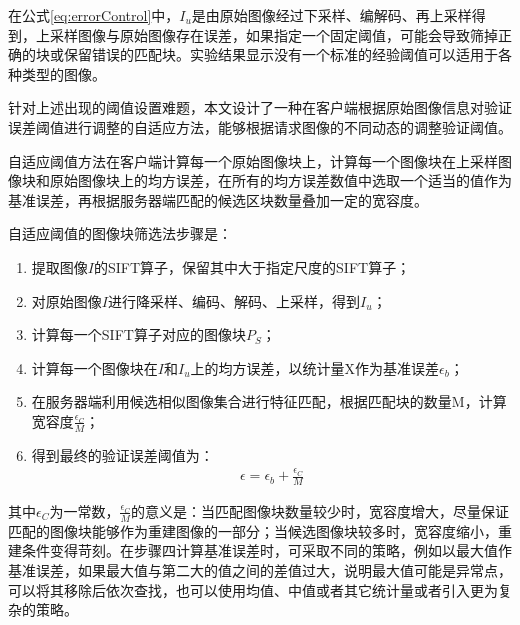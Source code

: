 \documentclass[UTF8]{csoarticle}
\begin{document}
在公式\ref{eq:errorControl}中，\(I_u\)是由原始图像经过下采样、编解码、再上采样得到，上采样图像与原始图像存在误差，如果指定一个固定阈值，可能会导致筛掉正确的块或保留错误的匹配块。实验结果显示没有一个标准的经验阈值可以适用于各种类型的图像。

针对上述出现的阈值设置难题，本文设计了一种在客户端根据原始图像信息对验证误差阈值进行调整的自适应方法，能够根据请求图像的不同动态的调整验证阈值。


自适应阈值方法在客户端计算每一个原始图像块上，计算每一个图像块在上采样图像块和原始图像块上的均方误差，在所有的均方误差数值中选取一个适当的值作为基准误差，再根据服务器端匹配的候选区块数量叠加一定的宽容度。

自适应阈值的图像块筛选法步骤是：
\begin{enumerate}
\item 提取图像\(I\)的SIFT算子，保留其中大于指定尺度的SIFT算子；
\item 对原始图像\(I\)进行降采样、编码、解码、上采样，得到\(I_u\)；
\item 计算每一个SIFT算子对应的图像块\(P_S\)；
\item 计算每一个图像块在\(I\)和\(I_u\)上的均方误差，以统计量X作为基准误差\(\epsilon_b\)；
\item 在服务器端利用候选相似图像集合进行特征匹配，根据匹配块的数量M，计算宽容度\(\frac{\epsilon_C}{M}\)；
\item 得到最终的验证误差阈值为：
\begin{align}
\epsilon = \epsilon_b + \frac{\epsilon_C}{M}
\end{align}
\end{enumerate}

其中\(\epsilon_C\)为一常数，\(\frac{\epsilon_C}{M}\)的意义是：当匹配图像块数量较少时，宽容度增大，尽量保证匹配的图像块能够作为重建图像的一部分；当候选图像块较多时，宽容度缩小，重建条件变得苛刻。在步骤四计算基准误差时，可采取不同的策略，例如以最大值作基准误差，如果最大值与第二大的值之间的差值过大，说明最大值可能是异常点，可以将其移除后依次查找，也可以使用均值、中值或者其它统计量或者引入更为复杂的策略。
\end{document}
